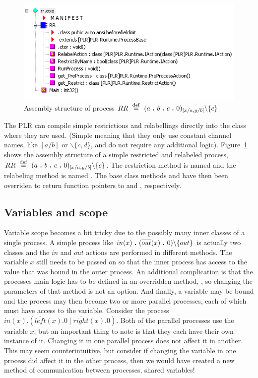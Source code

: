	\begin{figure}
		\begin{center}\includegraphics[scale=0.7]{ex_rr.png}\end{center}
		\caption{Assembly structure of process  $RR \ \stackrel{\mathrm{def}}{=}\  (a \ \textbf{.}\  b \ \textbf{.}\  c \ \textbf{.}\  0)_{[x/a,y/b]} \backslash \{ c \}$}
		\label{fig:struct_restrictrelabel}
	\end{figure}

	The PLR can compile simple restrictions and relabellings directly into the 
	class where they are used. (Simple meaning that they only use constant 
	channel names, like $[a/b]$ or $\backslash\{c,d\}$, and do not require any 
	additional logic). Figure~\ref{fig:struct_restrictrelabel} shows the 
	assembly structure of a simple restricted and relabeled process, $RR \ \stackrel{\mathrm{def}}{=}\  
	(a \ \textbf{.}\  b \ \textbf{.}\  c \ \textbf{.}\  0)_{[x/a,y/b]} \backslash \{ c \}$. The 
	restriction method is named  and the relabeling method 
	is named . The base class methods 
	 and  have then been overriden to 
	return function pointers to  and , 
	respectively.

	\subsection{Variables and scope}
	
	Variable scope becomes a bit tricky due to the possibly many inner classes
	of a single process. A simple process like $in(x) \ \textbf{.}\  (\overline{out}(x) 
	\ \textbf{.}\  0)\backslash\{out\}$ is actually two classes and the $in$ and $out$ 
	actions are performed in different methods. The variable $x$ still needs to 
	be passed on so that the inner process has access to the value that was 
	bound in the outer process. An additional complication is that the processes 
	main logic has to be defined in an overridden method, , so 
	changing the parameters of that method is not an option. And finally, a 
	variable may be bound and the process may then become two or more parallel 
	processes, each of which must have access to the variable. Consider the 
	process $in(x) . (\overline{left}(x) . 0 \mid \overline{right}(x).0)$. Both 
	of the parallel processes use the variable $x$, but an important thing to 
	note is that they each have their own instance of it. Changing it in one 
	parallel process does not affect it in another. This may seem 
	counterintuitive, but consider if changing the variable in one process did 
	affect it in the other process, then we would have created a new method of 
	communication between processes, shared variables!
	

